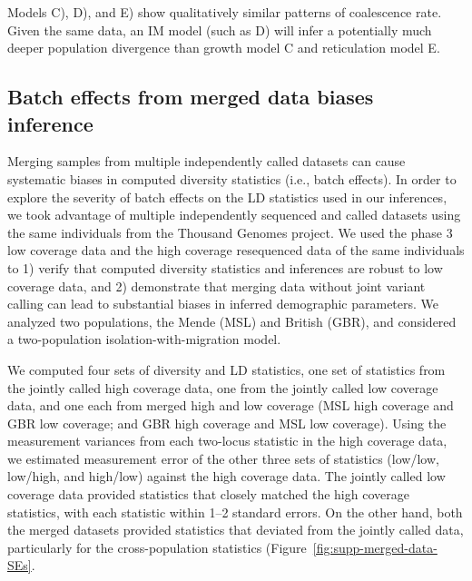 \documentclass[]{article}
\begin{document}
Models C), D), and E) show qualitatively similar patterns of coalescence rate. 
Given the same data, an IM model (such as D) will infer a potentially much 
deeper population divergence than growth model C and reticulation model E.    
 
 



\subsection{Batch effects from merged data biases inference}\label{sec:merged-bias}

Merging samples from multiple independently called datasets can cause
systematic biases in computed diversity statistics (i.e., batch effects). In
order to explore the severity of batch effects on the LD statistics used in our
inferences, we took advantage of multiple independently sequenced and called
datasets using the same individuals from the Thousand Genomes project. We used
the phase 3 low coverage \citet{1000_Genomes_Project_Consortium2015-zq} data
and the high coverage resequenced data of the same individuals
\citep{Byrska-Bishop2021-jl} to 1) verify that computed diversity statistics
and inferences are robust to low coverage data, and 2) demonstrate that merging
data without joint variant calling can lead to substantial biases in inferred
demographic parameters. We analyzed two populations, the Mende (MSL) and
British (GBR), and considered a two-population isolation-with-migration model.

We computed four sets of diversity and LD statistics, one set of statistics
from the jointly called high coverage data, one from the jointly called low
coverage data, and one each from merged high and low coverage (MSL high
coverage and GBR low coverage; and GBR high coverage and MSL low coverage).
Using the measurement variances from each two-locus statistic in the high
coverage data, we estimated measurement error of the other three sets of
statistics (low/low, low/high, and high/low) against the high coverage data.
The jointly called low coverage data provided statistics that closely matched
the high coverage statistics, with each statistic within 1--2 standard errors.
On the other hand, both the merged datasets provided statistics that deviated
from the jointly called data, particularly for the cross-population statistics
(Figure~\ref{fig:supp-merged-data-SEs}.
\end{document}
